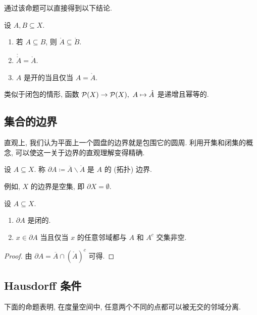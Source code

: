 通过该命题可以直接得到以下结论.

\begin{corollary}
    设 \(A, B \subseteq X\).
    \begin{enumerate}
        \item 若 \(A \subseteq B\), 则 \(\mathring A \subseteq \mathring B\).
        \item \(\mathring{\mathring A} = \mathring A\).
        \item \(A\) 是开的当且仅当 \(A = \mathring A\).
    \end{enumerate}
\end{corollary}

类似于闭包的情形, 函数 \(\mathcal P(X) \to \mathcal P(X),\ A \mapsto \mathring A\) 是递增且幂等的.

\subsection{集合的边界}

直观上, 我们认为平面上一个圆盘的边界就是包围它的圆周. 利用开集和闭集的概念, 可以使这一关于边界的直观理解变得精确.

\begin{definition}[边界]
    设 \(A \subseteq X\). 称 \(\partial A \coloneqq \overline A \backslash \mathring A\) 是 \(A\) 的 (拓扑) 边界.
\end{definition}

例如, \(X\) 的边界是空集, 即 \(\partial X = \emptyset\).

\begin{proposition}\label{prop:property-of-boundary}
    设 \(A \subseteq X\).
    \begin{enumerate}
        \item \(\partial A\) 是闭的.
        \item \(x \in \partial A\) 当且仅当 \(x\) 的任意邻域都与 \(A\) 和 \(A^c\) 交集非空.
    \end{enumerate}
\end{proposition}

\begin{proof}
    由 \(\partial A = \overline A \cap (\mathring A)^c\) 可得.
\end{proof}

\subsection{Hausdorff 条件}

下面的命题表明, 在度量空间中, 任意两个不同的点都可以被无交的邻域分离.

